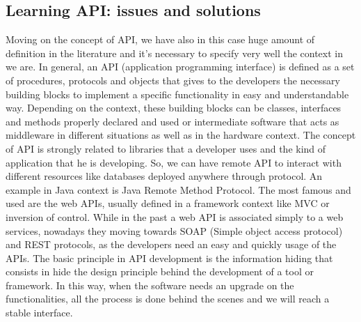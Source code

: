 \subsection{Learning API: issues and solutions}
Moving on the concept of API, we have also in this case huge amount of definition in the literature and it's necessary to specify very well the context in we are. In general, an API (application programming interface) is defined as a set of procedures, protocols and objects that gives to the developers the necessary building blocks to implement a specific functionality in easy and understandable way. Depending on the context, these building blocks can be classes, interfaces and methods properly declared and used or intermediate software that acts as middleware in different situations as well as in the hardware context. The concept of API is strongly related to libraries that a developer uses and the kind of application that he is developing. So, we can have remote API to interact with different resources like databases deployed anywhere through protocol. An example in Java context is Java Remote Method Protocol. The most famous and used are the web APIs, usually defined in a framework context like MVC or inversion of control. While in the past a web API is associated simply to a web services, nowadays they moving towards SOAP (Simple object access protocol) and REST protocols, as the developers need an easy and quickly usage of the APIs. The basic principle in API development is the information hiding that consists in hide the design principle behind the development of a tool or framework. In this way, when the software needs an upgrade on the functionalities, all the process is done behind the scenes and we will reach a stable interface. \newline
